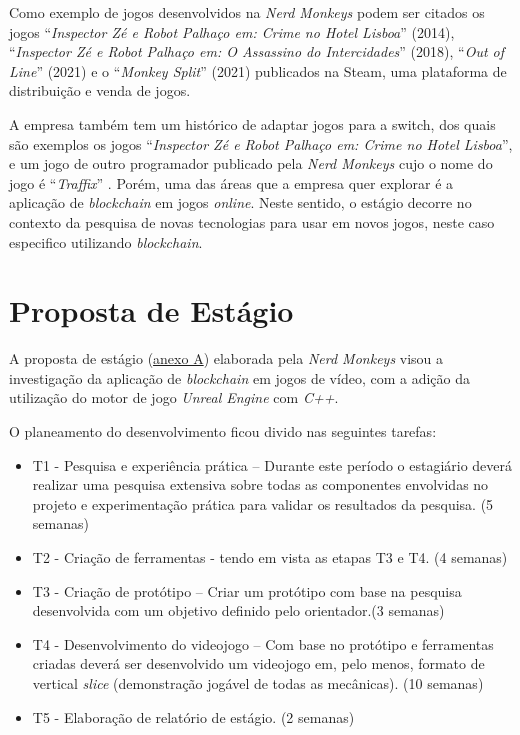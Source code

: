 Como exemplo de jogos desenvolvidos na \textit{Nerd Monkeys} podem ser citados os jogos  ``\textit{Inspector Zé e Robot Palhaço em: Crime no Hotel Lisboa}'' (2014), ``\textit{Inspector Zé e Robot Palhaço em: O Assassino do Intercidades}'' (2018), ``\textit{Out of Line}'' (2021) e o ``\textit{Monkey Split}'' (2021) \cite{nerd_games_steam} publicados na Steam, uma plataforma de distribuição e venda de jogos.

A empresa também tem um histórico de adaptar jogos para a \gls{switch}, dos quais são exemplos os jogos ``\textit{Inspector Zé e Robot Palhaço em: Crime no Hotel Lisboa}''\cite{ze_eshop}, 
e um jogo de outro programador publicado pela \textit{Nerd Monkeys} cujo o nome do jogo é ``\textit{Traffix}'' \cite{traffix_eshop}. Porém, uma das áreas que a empresa quer explorar é a aplicação de \textit{blockchain} em jogos \textit{online}. Neste sentido, o estágio decorre no contexto da pesquisa de novas tecnologias para usar em novos jogos, neste caso especifico utilizando \textit{blockchain}.

\section{Proposta de Estágio}

A proposta de estágio (\hyperref[anexo:A]{anexo A}) elaborada pela \textit{Nerd Monkeys} visou a investigação da aplicação de \textit{blockchain} em jogos de vídeo, com a adição da utilização do motor de jogo \textit{Unreal Engine} com \textit{C++}.

O planeamento do desenvolvimento ficou divido nas seguintes tarefas:

\begin{itemize}
    \item T1 - Pesquisa e experiência prática – Durante este período o estagiário deverá realizar
    uma pesquisa extensiva sobre todas as componentes envolvidas no projeto e
    experimentação prática para validar os resultados da pesquisa. (5 semanas)

    \item T2 - Criação de ferramentas - tendo em vista as etapas T3 e T4. (4 semanas)

    \item T3 - Criação de protótipo – Criar um protótipo com base na pesquisa desenvolvida com um objetivo definido pelo orientador.(3 semanas)

     \item T4 - Desenvolvimento do videojogo – Com base no protótipo e ferramentas criadas deverá ser desenvolvido um videojogo em, pelo menos, formato de vertical \textit{slice} (demonstração jogável de todas as mecânicas). (10 semanas)

    \item T5 - Elaboração de relatório de estágio. (2 semanas)
\end{itemize}


